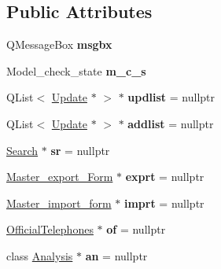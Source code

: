 \subsection*{Public Attributes}
\begin{DoxyCompactItemize}
\item 
\mbox{\label{class_main_window_aaaf9f76564775ffdb2cbdb77bf503985}} 
Q\+Message\+Box {\bfseries msgbx}
\item 
\mbox{\label{class_main_window_a52a93dfd081b14c7435db1145d79b60c}} 
Model\+\_\+check\+\_\+state {\bfseries m\+\_\+c\+\_\+s}
\item 
\mbox{\label{class_main_window_a72ca81c7f0658bffefcfa45098a9e9de}} 
Q\+List$<$ \mbox{\hyperlink{class_update}{Update}} $\ast$ $>$ $\ast$ {\bfseries updlist} = nullptr
\item 
\mbox{\label{class_main_window_ac2bd217a9982850840a15ea604470b3b}} 
Q\+List$<$ \mbox{\hyperlink{class_update}{Update}} $\ast$ $>$ $\ast$ {\bfseries addlist} = nullptr
\item 
\mbox{\label{class_main_window_af059d2ceb7e3657642ab6b59c5ef1597}} 
\mbox{\hyperlink{class_search}{Search}} $\ast$ {\bfseries sr} = nullptr
\item 
\mbox{\label{class_main_window_a0fb07bce1118e99931bd9f5d564068dc}} 
\mbox{\hyperlink{class_master__export___form}{Master\+\_\+export\+\_\+\+Form}} $\ast$ {\bfseries exprt} = nullptr
\item 
\mbox{\label{class_main_window_aa0b4bfbd900e253306802d7ee1d08097}} 
\mbox{\hyperlink{class_master__import__form}{Master\+\_\+import\+\_\+form}} $\ast$ {\bfseries imprt} = nullptr
\item 
\mbox{\label{class_main_window_a639228bb747488359a821d8597280fe4}} 
\mbox{\hyperlink{class_official_telephones}{Official\+Telephones}} $\ast$ {\bfseries of} = nullptr
\item 
\mbox{\label{class_main_window_a91d246b51f455d163c2c9462c588ed2c}} 
class \mbox{\hyperlink{class_analysis}{Analysis}} $\ast$ {\bfseries an} = nullptr

\end{DoxyCompactItemize}
